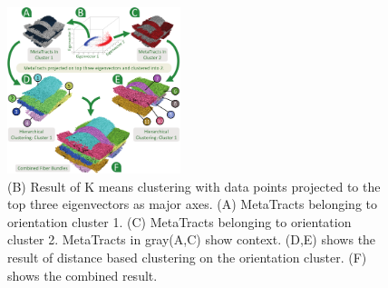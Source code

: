 \begin{figure}[tb] 
  \centering  	
 \includegraphics[width=0.45\textwidth]{imagesMT2014/figure6.pdf}
  	\caption{(B) Result of K means clustering with data points projected to the top three eigenvectors as major axes. (A) MetaTracts belonging to orientation cluster 1. (C) MetaTracts belonging to orientation cluster 2. MetaTracts in gray(A,C) show context.
  	(D,E) shows the result of distance based clustering on the orientation cluster. (F) shows the combined result. }
  \label{fig:orientation_clustering}
  \end{figure}

